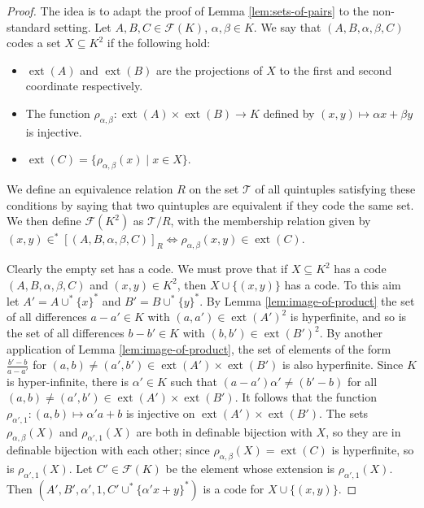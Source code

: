 \documentclass{amsart}
\newcommand{\ca}{\mathcal}
\theoremstyle{plain}
\theoremstyle{definition}
\newcommand{\ins}{\in^*}
\newcommand{\F}{\mathcal{F}}
\newcommand{\ext}[1]{\operatorname{ext}(#1)}
\begin{document}
\begin{proof}
    The idea is to adapt the proof of Lemma \ref{lem:sets-of-pairs} to the non-standard setting. Let $A,B,C \in \F(K)$, $\alpha,\beta \in K$. We say that $(A,B,\alpha,\beta,C)$ codes a set $X \subseteq K^2$ if the following hold:
    \begin{itemize}
        \item[(i)] $\ext A$ and $\ext B$ are the projections of $X$ to the first and second coordinate respectively.
        \item[(ii)] The function $\rho_{\alpha,\beta}: \ext A \times \ext B \to K$ defined by $(x,y) \mapsto \alpha x + \beta y$ is injective.
        \item[(iii)] $\ext C= \{\rho_{\alpha,\beta}(x) \mid x \in X\}$.
    \end{itemize}
    We define an equivalence relation $R$ on the set $\ca T$ of all quintuples satisfying these conditions by saying that two quintuples are equivalent if they code the same set. We then define $\F(K^2)$ as $\ca T/R$, with the membership relation given by $(x,y) \ins [(A,B,\alpha,\beta,C)]_R \iff \rho_{\alpha,\beta}(x,y) \in \ext C$.

Clearly the empty set has a code. We must prove that if $X\subseteq K^2$ has a code $(A,B,\alpha,\beta,C)$ and $(x,y)\in K^2$, then $X \cup \{(x,y)\}$ has a code. To this aim let $A' = A \cup^* \{x\}^*$ and $B' = B\cup^* \{y\}^*$. By Lemma \ref{lem:image-of-product} the set of all differences $a-a'\in K$ with $(a,a')\in \ext {A'}^2$ is hyperfinite, and so is the set of all differences $b-b'\in K$ with $(b,b') \in \ext{B'}^2$. By another application of Lemma \ref{lem:image-of-product}, the set of elements of the form $\frac{b'-b}{a-a'}$ for $(a,b) \neq (a',b') \in \ext{A'}\times \ext{B'}$ is also hyperfinite. Since $K$ is hyper-infinite, there is $\alpha' \in K$ such that $(a-a')\alpha' \neq (b'-b)$ for all $(a,b) \neq (a',b') \in \ext{A'}\times \ext{B'}$. It follows that the function $\rho_{\alpha',1}:(a,b) \mapsto \alpha' a +b$ is injective on $\ext{A'} \times \ext{B'}$. The sets $\rho_{\alpha,\beta}(X)$ and $\rho_{\alpha',1}(X)$ are both in definable bijection with $X$, so they are in definable bijection with each other; since $\rho_{\alpha,\beta}(X)=\ext C$ is hyperfinite, so is $\rho_{\alpha',1}(X)$. Let $C' \in \F(K)$ be the element whose extension is $\rho_{\alpha',1}(X)$. Then $(A',B',\alpha',1, C' \cup^*\{\alpha' x + y \}^*)$ is a code for $X \cup \{(x,y)\}$.


\end{proof}
\end{document}
